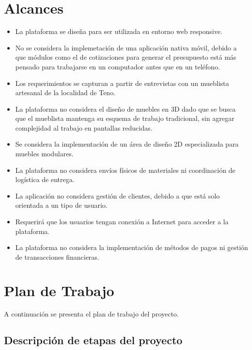 ﻿\documentclass{iccmemoria}
\begin{document}
\section{Alcances}
\begingroup
\small
\begin{itemize}
\item La plataforma se diseña para ser utilizada en entorno web responsive.

\item No se considera la implemetación de una aplicación nativa móvil, debido a que módulos como el de cotizaciones para generar el presupuesto está más pensado para trabajarse en un computador antes que en un teléfono.

\item Los requerimientos se capturan a partir de entrevistas con un mueblista artesanal de la localidad de Teno.

\item La plataforma no considera el diseño de muebles en 3D dado  que se busca que el mueblista mantenga su esquema de trabajo tradicional, sin agregar complejidad al trabajo en pantallas reducidas.

\item Se considera la implementación de un área de diseño 2D especializada para muebles modulares.

\item La plataforma no considera envíos físicos de materiales ni coordinación de logística de entrega.

\item La aplicación no considera gestión de clientes, debido a que está solo orientada a un tipo de usuario.

\item Requerirá que los usuarios tengan conexión a Internet para acceder a la plataforma.

\item La plataforma no considera la implementación de métodos de pagos ni gestión de transacciones financieras.

\end{itemize}
\endgroup



\section{Plan de Trabajo}
\begingroup
\small
 A continuación se presenta el plan de trabajo del proyecto.
\subsection{Descripción de etapas del proyecto}
\end{document}
